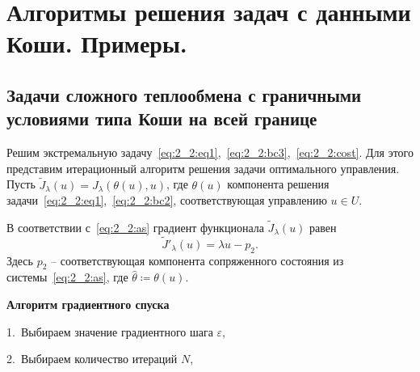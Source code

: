 \section{Алгоритмы решения задач с данными Коши. Примеры.}\label{sec:ch4/sec4}

\subsection{
    Задачи сложного теплообмена
    с граничными условиями типа Коши на всей границе
}\label{subsec:ch4/sec4/subsec1}

Решим экстремальную задачу~\eqref{eq:2_2:eq1},~\eqref{eq:2_2:bc3},~\eqref{eq:2_2:cost}.
Для этого представим итерационный алгоритм решения задачи оптимального управления.
Пусть $\tilde J_\lambda(u)=J_\lambda(\theta(u), u)$, где $\theta(u)$ компонента решения
задачи~\eqref{eq:2_2:eq1},~\eqref{eq:2_2:bc2}, соответствующая управлению $u\in U$.

В соответствии с~\eqref{eq:2_2:as} градиент функционала $\tilde J_\lambda(u)$ равен
\[
    \tilde J'_\lambda (u) = \lambda u - p_2.
\]
Здесь $p_2$ -- соответствующая компонента сопряженного
состояния из системы~\eqref{eq:2_2:as}, где $\hat{\theta}\coloneqq\theta(u)$.

\textbf{Алгоритм градиентного спуска}

1.\ Выбираем значение градиентного шага $\varepsilon$,

2.\ Выбираем количество итераций $N$,

